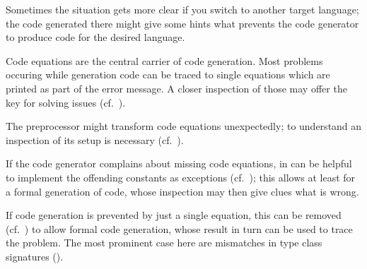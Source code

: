 \begin{isabellebody}
\begin{isamarkuptext}
  \begin{description}

      Sometimes
      the situation gets more clear if you switch to another target
      language; the code generated there might give some hints what
      prevents the code generator to produce code for the desired
      language.

      Code equations are the central
      carrier of code generation.  Most problems occuring while generation
      code can be traced to single equations which are printed as part of
      the error message.  A closer inspection of those may offer the key
      for solving issues (cf.~).

      The preprocessor might
      transform code equations unexpectedly; to understand an
      inspection of its setup is necessary (cf.~).

      If the code generator
      complains about missing code equations, in can be helpful to
      implement the offending constants as exceptions
      (cf.~); this allows at least for a formal
      generation of code, whose inspection may then give clues what is
      wrong.

      If code
      generation is prevented by just a single equation, this can be
      removed (cf.~) to allow formal code
      generation, whose result in turn can be used to trace the
      problem.  The most prominent case here are mismatches in type
      class signatures ().

  \end{description}%
\end{isamarkuptext}%
\isamarkuptrue%
%
\isadelimtheory
%
\endisadelimtheory
%
\isatagtheory
{}\isamarkupfalse%
%
\endisatagtheory
{\isafoldtheory}%
%
\isadelimtheory
%
\endisadelimtheory
\isanewline
\end{isabellebody}%
